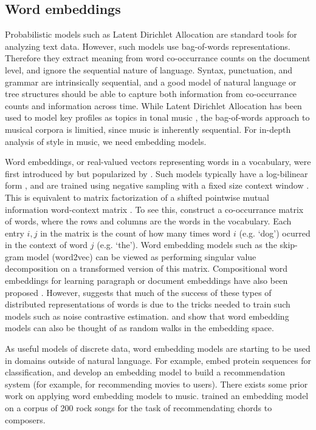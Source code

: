 
\subsection{Word embeddings}
Probabilistic models such as Latent Dirichlet Allocation \cite{Blei2003} are standard tools for analyzing text data. However, such models use bag-of-words representations. Therefore they extract meaning from word co-occurrance counts on the document level, and ignore the sequential nature of language. Syntax, punctuation, and grammar are intrinsically sequential, and a good model of natural language or tree structures should be able to capture both information from co-occurrance counts and information across time. While Latent Dirichlet Allocation has been used to model key profiles as topics in tonal music \cite{Hu2009}, the bag-of-words approach to musical corpora is limitied, since music is inherently sequential. For in-depth analysis of style in music, we need embedding models.

Word embeddings, or real-valued vectors representing words in a vocabulary, were first introduced by \cite{Bengio2003} but popularized by \cite{Mikolov2013a}. Such models typically have a log-bilinear form \cite{Mnih2007}, and are trained using negative sampling with a fixed size context window \cite{Mikolov2013a}. This is equivalent to matrix factorization of a shifted pointwise mutual information word-context matrix \cite{Levy}. To see this, construct a co-occurrance matrix of words, where the rows and columns are the words in the vocabulary. Each entry $i, j$ in the matrix is the count of how many times word $i$ (e.g. `dog') ocurred in the context of word $j$ (e.g. `the'). Word embedding models such as the skip-gram model (word2vec) can be viewed as performing singular value decomposition on a transformed version of this matrix.  Compositional word embeddings for learning paragraph or document embeddings have also been proposed \cite{Le2014,Dai2015}. However, \cite{Levy2015a} suggests that much of the success of these types of distributed representations of words is due to the tricks needed to train such models such as noise contrastive estimation. \cite{Arora2015} and \cite{Arora2016} show that word embedding models can also be thought of as random walks in the embedding space.

As useful models of discrete data, word embedding models are starting to be used in domains outside of natural language. For example, \cite{Asgari2015} embed protein sequences for classification, and \cite{Guardia-Sebaoun2015} develop an embedding model to build a recommendation system (for example, for recommending movies to users). There exists some prior work on applying word embedding models to music. \cite{Huang2016} trained an embedding model on a corpus of 200 rock songs for the task of recommendating chords to composers.

